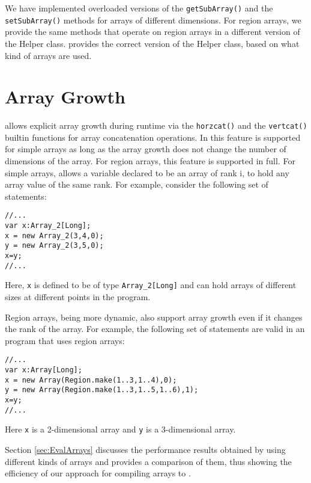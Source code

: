 We have implemented overloaded versions of the \texttt{getSubArray()} and the
\texttt{setSubArray()} methods for arrays of different dimensions. For region
arrays, we provide the same methods that operate on region arrays in a different
version of the Helper class.  \mixten provides the correct version of the Helper
class, based on what kind of arrays are used.


\section{Array Growth} 

\matlab allows explicit array growth during runtime via the \texttt{horzcat()}
and the \texttt{vertcat()} builtin functions for array concatenation operations. 
In \mixten this feature is
supported for simple arrays as long as the array growth does not change the
number of dimensions of the array. For region arrays, this feature is supported
in full. For simple arrays, \xten allows a variable declared to be an array of
rank i, to hold any array value of the same rank. For example, consider the
following set of statements:
\begin{lstlisting}[language=x10,numbers=none]                                
//...
var x:Array_2[Long];
x = new Array_2(3,4,0);
y = new Array_2(3,5,0);
x=y;
//...
\end{lstlisting}
Here, \verb|x| is defined to be of type \texttt{Array\_2[Long]} and can hold
arrays of different sizes at different points in the program.

Region arrays, being more dynamic, also support array growth even if it changes
the rank of the array. For example, the following set of statements are valid in
an \xten program that uses region arrays:
\begin{lstlisting}[language=x10,numbers=none]                                
//...
var x:Array[Long];
x = new Array(Region.make(1..3,1..4),0);
y = new Array(Region.make(1..3,1..5,1..6),1);
x=y;
//...
\end{lstlisting}
Here \verb|x| is a 2-dimensional array and \verb|y| is a 3-dimensional array. 

\par
Section \ref{sec:EvalArrays} discusses the performance results obtained by
using
different kinds of arrays and provides a comparison of them, thus showing the
efficiency of our approach for compiling \matlab arrays to \xten.

